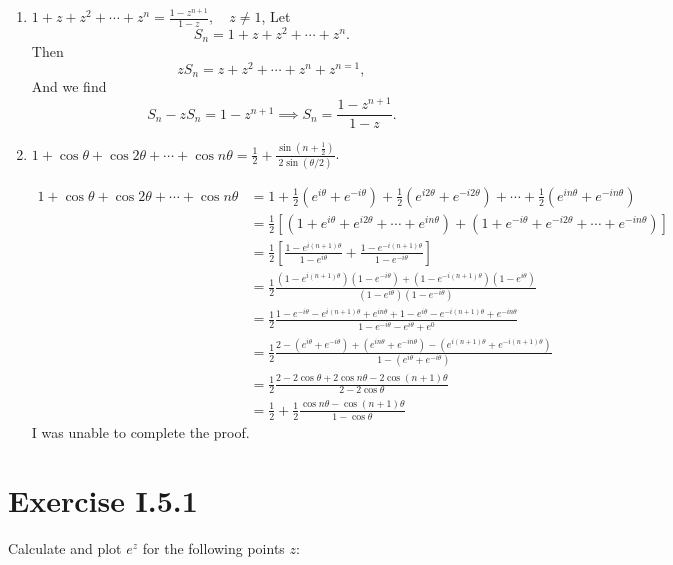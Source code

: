 \documentclass[12pt]{article}
\newenvironment{problem}
    {\begin{lrbox}{\mybox}\begin{minipage}{\textwidth-10pt}}
    {\end{minipage}\end{lrbox}\framebox[6.5in]{\usebox{\mybox}}}
\newcommand{\ds}{\displaystyle}
\begin{document}
\begin{enumerate}[label=(\alph*)]
    \item $\ds1+z+z^2+\cdots+z^n = \frac{1-z^{n+1}}{1-z}, \quad z\ne1$,
    Let
    \[S_n = 1+z + z^2 + \cdots + z^n.\]
    Then
    \[zS_n = z + z^2 + \cdots + z^n + z^{n=1},\]
    And we find
    \[S_n-zS_n = 1-z^{n+1} \implies S_n = \frac{1-z^{n+1}}{1-z}.\]
    
    
    
    \item $1+\cos\theta + \cos2\theta + \cdots + \cos n\theta = \frac12 + \frac{\sin(n+\frac12)}{2\sin(\theta/2)}$.
    
    \begin{align*}
        1+\cos\theta + \cos2\theta + \cdots + \cos n\theta
            &= 1 + \frac12(e^{i\theta} + e^{-i\theta}) + \frac12(e^{i2\theta} + e^{-i2\theta}) + \cdots + \frac12(e^{in\theta} + e^{-in\theta}) \\
            &= \frac12\left[(1 + e^{i\theta} + e^{i2\theta} + \cdots + e^{in\theta}) + (1 + e^{-i\theta} + e^{-i2\theta} + \cdots + e^{-in\theta})\right] \\
            &= \frac12\left[\frac{1-e^{i(n+1)\theta}}{1-e^{i\theta}} + \frac{1-e^{-i(n+1)\theta}}{1-e^{-i\theta}}\right] \\
            &= \frac12\frac{(1-e^{i(n+1)\theta})(1-e^{-i\theta}) + (1-e^{-i(n+1)\theta})(1-e^{i\theta})}{(1-e^{i\theta})(1-e^{-i\theta})} \\
            &= \frac12\frac{1-e^{-i\theta} - e^{i(n+1)\theta} + e^{in\theta} + 1 - e^{i\theta} - e^{-i(n+1)\theta} + e^{-in\theta}}{1 - e^{-i\theta} - e^{i\theta} + e^0} \\
            &= \frac12\frac{2 - (e^{i\theta} + e^{-i\theta}) + (e^{in\theta} + e^{-in\theta}) - (e^{i(n+1)\theta} + e^{-i(n+1)\theta})}{1-(e^{i\theta} + e^{-i\theta})} \\
            &= \frac12\frac{2 - 2\cos\theta + 2\cos n\theta - 2\cos(n+1)\theta}{2-2\cos\theta} \\
            &= \frac12 + \frac12\frac{\cos n\theta - \cos(n+1)\theta}{1-\cos\theta}
    \end{align*}
    I was unable to complete the proof.
    
\end{enumerate}


\section*{Exercise I.5.1}
\begin{problem}
    Calculate and plot $e^z$ for the following points $z$:
\end{problem}
\end{document}
